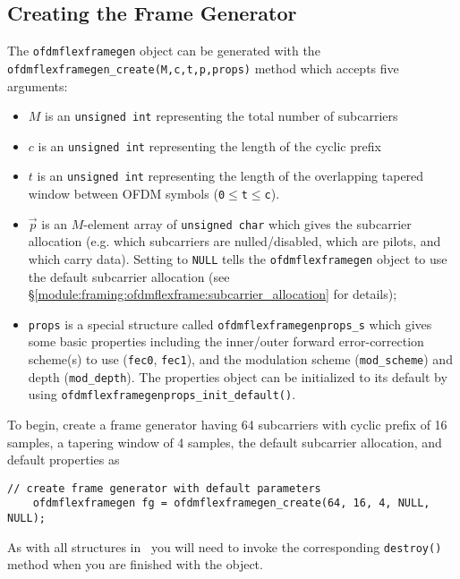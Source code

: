 \subsection{Creating the Frame Generator}
\label{tutorial:ofdmflexframe:framegen}
%
The {\tt ofdmflexframegen} object can be generated with the
{\tt ofdmflexframegen\_create(M,c,t,p,props)} method which accepts five
arguments:
%
\begin{itemize}
\item $M$ is an {\tt unsigned int} representing the total number of
    subcarriers
\item $c$ is an {\tt unsigned int} representing the length of the
    cyclic prefix
\item $t$ is an {\tt unsigned int} representing the length of the
    overlapping tapered window between OFDM symbols
    ({\tt 0}$\leq${\tt t}$\leq${\tt c}).
\item $\vec{p}$ is an $M$-element array of {\tt unsigned char} which
    gives the subcarrier allocation (e.g. which subcarriers
    are nulled/disabled, which are pilots, and which carry data).
    Setting to {\tt NULL} tells the {\tt ofdmflexframegen} object to use
    the default subcarrier allocation
    (see \S\ref{module:framing:ofdmflexframe:subcarrier_allocation} for
    details);
\item {\tt props} is a special structure called
    {\tt ofdmflexframegenprops\_s}
    which gives some basic properties including
    the inner/outer forward error-correction scheme(s) to use
    ({\tt fec0}, {\tt fec1}),
    and the modulation scheme ({\tt mod\_scheme}) and depth
    ({\tt mod\_depth}).
    The properties object can be initialized to its default by using
    {\tt ofdmflexframegenprops\_init\_default()}.
\end{itemize}
%
To begin, create a frame generator having 64 subcarriers with cyclic
prefix of 16 samples, a tapering window of 4 samples,
the default subcarrier allocation, and
default properties as
%
\begin{Verbatim}[fontsize=\small]
    // create frame generator with default parameters
    ofdmflexframegen fg = ofdmflexframegen_create(64, 16, 4, NULL, NULL);
\end{Verbatim}
%
As with all structures in \liquid\ you will need to invoke the
corresponding {\tt destroy()} method when you are finished with the
object.

